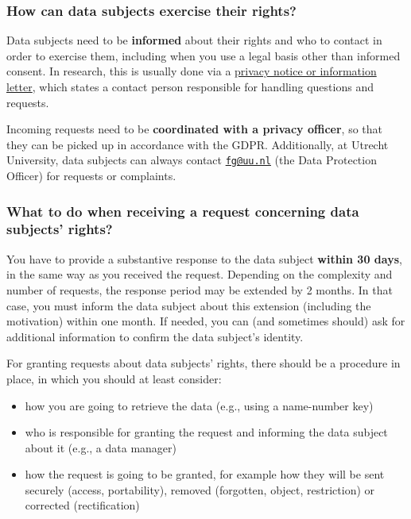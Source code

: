 \documentclass[
]{book}
\providecommand{\tightlist}{%
  \setlength{\itemsep}{0pt}\setlength{\parskip}{0pt}}
\begin{document}
\hypertarget{how-can-data-subjects-exercise-their-rights}{%
\subsubsection{How can data subjects exercise their rights?}\label{how-can-data-subjects-exercise-their-rights}}

Data subjects need to be \textbf{informed} about their rights and who to contact in
order to exercise them, including when you use a legal basis other than informed
consent. In research, this is usually done via a
\protect\hyperlink{privacy-notices}{privacy notice or information letter}, which states
a contact person responsible for handling questions and requests.

Incoming requests need to be \textbf{coordinated with a privacy officer}, so that
they can be picked up in accordance with the GDPR. Additionally, at Utrecht
University, data subjects can always contact
\href{mailto:fg@uu.nl}{\nolinkurl{fg@uu.nl}} (the Data Protection Officer) for
requests or complaints.

\hypertarget{what-to-do-when-receiving-a-request-concerning-data-subjects-rights}{%
\subsubsection{What to do when receiving a request concerning data subjects' rights?}\label{what-to-do-when-receiving-a-request-concerning-data-subjects-rights}}

You have to provide a substantive response to the data subject \textbf{within 30 days},
in the same way as you received the request. Depending on the complexity and
number of requests, the response period may be extended by 2 months. In that
case, you must inform the data subject about this extension (including the
motivation) within one month. If needed, you can (and sometimes should) ask for
additional information to confirm the data subject's identity.

For granting requests about data subjects' rights, there should be a procedure
in place, in which you should at least consider:

\begin{itemize}
\tightlist
\item
  how you are going to retrieve the data (e.g., using a name-number key)
\item
  who is responsible for granting the request and informing the data subject
  about it (e.g., a data manager)
\item
  how the request is going to be granted, for example how they will be sent
  securely (access, portability), removed (forgotten, object, restriction) or
  corrected (rectification)
\end{itemize}
\end{document}
